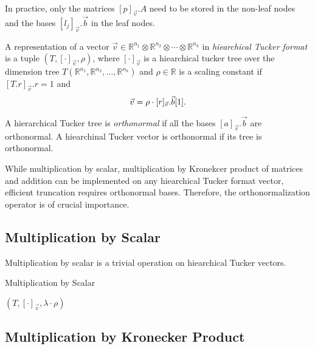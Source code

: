 In practice, only the matrices $[p]_{\vec{v}}.A$ need to be stored in
the non-leaf nodes and the bases $[l_j]_{\vec{v}}.\vec{b}$ in the leaf
nodes.

\begin{dfn}
  A representation of a vector
  $\vec{v} \in \mathbb{R}^{n_1} \otimes \mathbb{R}^{n_2} \otimes
  \cdots \otimes \mathbb{R}^{n_k}$
  in \emph{hiearchical Tucker format} is a tuple
  $(T, [\cdot]_{\vec{v}}, \rho)$, where $[\cdot]_{\vec{v}}$ is a
  hiearchical tucker tree over the dimension tree
  $T(\mathbb{R}^{n_1}, \mathbb{R}^{n_2}, \ldots, \mathbb{R}^{n_k})$
  and $\rho \in \mathbb{R}$ is a scaling constant if
  $[T.r]_{\vec{v}}.r = 1$ and
  \begin{equation}
    \vec{v} = \rho \cdot [r]_{\vec{v}}.\vec{b}[1] \text.
  \end{equation}
\end{dfn}

\begin{dfn}
  A hierarchical Tucker tree is \emph{orthonormal} if all the
  bases $[a]_{\vec{v}}.\vec{b}$ are orthonormal. A hiearchinal Tucker
  vector is orthonormal if its tree is orthonormal.
\end{dfn}

While multiplication by scalar, multiplication by Kronekcer product of
matrices and addition can be implemented on any hiearchical Tucker
format vector, efficient truncation requires orthonormal
bases. Therefore, the orthonormalization operator is of crucial
importance.

\subsection{Multiplication by Scalar}

Multiplication by scalar is a trivial operation on hiearchical Tucker
vectors.

\begin{algorithm}
  \caption{Multiplication by Scalar}
  \begin{algorithmic}[1]
    \State \Return $(T, [\cdot]_{\vec{v}}, \lambda \cdot \rho)$
    \EndFunction
  \end{algorithmic}
\end{algorithm}

\subsection{Multiplication by Kronecker Product}

